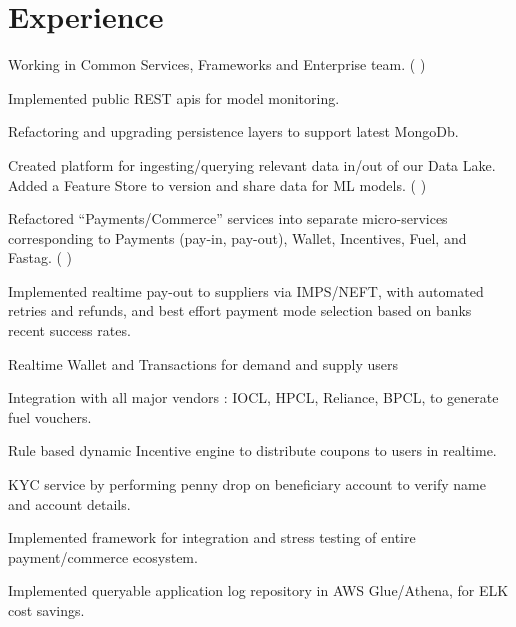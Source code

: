 \documentclass[]{deedy-resume-openfont}
\begin{document}
    
%
%
%
%
\section{Experience}
\hfill {}
\begin{tightemize}
	\item Working in Common Services, Frameworks and Enterprise team. (
		{}
	)
	\item Implemented public REST apis for model monitoring.
	\item Refactoring and upgrading persistence layers to support latest MongoDb.
\end{tightemize}
\sectionsep
{}\hfill {}
\begin{tightemize}
	\item Created platform for ingesting/querying relevant data in/out of our Data Lake. Added a Feature Store to version and share data for ML models. \newline (
		{}
	)
	\item Refactored “Payments/Commerce” services into separate micro-services corresponding to Payments (pay-in, pay-out), Wallet, Incentives, Fuel, and Fastag. \newline (
		{}
	)
	\item Implemented realtime pay-out to suppliers via IMPS/NEFT, with automated retries and refunds, and best effort payment mode selection based on banks\textquotesingle{} recent success rates.
	\item Realtime Wallet and Transactions for demand and supply users
	\item Integration with all major vendors : IOCL, HPCL, Reliance, BPCL, to generate fuel vouchers.
	\item Rule based dynamic Incentive engine to distribute coupons to users in realtime.
	\item KYC service by performing penny drop on beneficiary account to verify name and account details.
	\item Implemented framework for integration and stress testing of entire payment/commerce ecosystem.
	\item Implemented queryable application log repository in AWS Glue/Athena, for ELK cost savings.
\end{tightemize}
\end{document}
